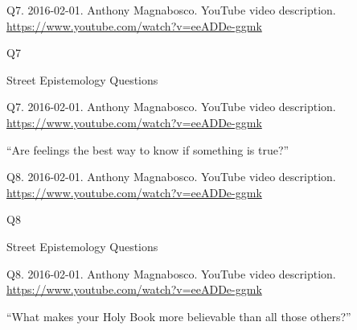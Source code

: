 \documentclass[
    src/templates/5x2-on-a4paper,
    frame
]{flashcards}
\newcommand{\myheader}{}
\newcommand{\myfooter}{
    \begin{flushright}
        \small\sc
        Street Epistemology Questions \par
    \end{flushright}
}
\begin{document}
        \renewcommand{\myheader}{
            \normalfont %
            \begin{tiny}
                Q7.
                2016-02-01.
                Anthony Magnabosco.
                    YouTube video description.
                    \\
                    \url{ https://www.youtube.com/watch?v=eeADDe-ggmk }
                \par
            \end{tiny}
        }
        \begin{flashcard}{
            \myheader
            \vspace{\fill}
            \begin{center}
                \large
                    Q7
            \end{center}
            \vspace{\fill}
            \myfooter
            \vspace{-1.4ex}
        }
            \myheader
            \vspace{\fill}
            \begin{center}
                \large
\enquote{Are feelings the best way to know if something is true?}            \end{center}
            \vspace{\fill}
        \end{flashcard}
        \renewcommand{\myheader}{
            \normalfont %
            \begin{tiny}
                Q8.
                2016-02-01.
                Anthony Magnabosco.
                    YouTube video description.
                    \\
                    \url{ https://www.youtube.com/watch?v=eeADDe-ggmk }
                \par
            \end{tiny}
        }
        \begin{flashcard}{
            \myheader
            \vspace{\fill}
            \begin{center}
                \large
                    Q8
            \end{center}
            \vspace{\fill}
            \myfooter
            \vspace{-1.4ex}
        }
            \myheader
            \vspace{\fill}
            \begin{center}
                \large
\enquote{What makes your Holy Book more believable than all those others?}            \end{center}
            \vspace{\fill}
        \end{flashcard}
\end{document}
